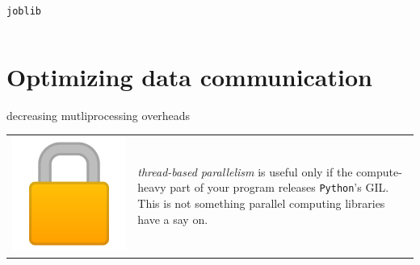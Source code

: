 \documentclass[13pt, usenames,dvipsnames]{beamer} %
\newcommand{\mycode}[2][\tiny] {\texttt{#2}}
\begin{document}
\begin{frame}[fragile]{\mycode{joblib}}
{\begin{tabular}{m{0.5cm} m{10cm}}
        \end{tabular}
        }

    \end{frame}
\section{Optimizing data communication}
    \begin{frame}[fragile]{decreasing mutliprocessing overheads}
        \begin{tabular}{m{0.5cm} m{10cm}}
            \includegraphics[width=\linewidth] {media/lock-emoji.png} &
            \textit{thread-based parallelism} is useful only if the compute-heavy part
            of your program releases \mycode{Python}'s GIL. This is not
            something parallel computing libraries have a say on. \\
        \end{tabular}
        \vspace{1em}


\end{frame}
\end{document}
